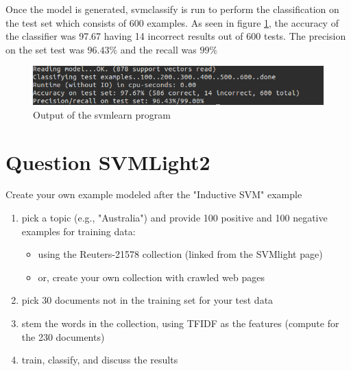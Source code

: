 \documentclass{article}
\begin{document}
Once the model is generated, svm\textunderscore classify is run to perform the classification on the test set which consists of 600 examples. As seen in figure \ref{fig:SVM_classify}, the accuracy of the classifier was 97.67 having 14 incorrect results out of 600 tests. The precision on the set test was $96.43\%$ and the recall was $99\%$ 
\begin{figure}[h]
			\centering
			\includegraphics[width=\linewidth]{svm_classify.png}
			\caption{Output of the svm\textunderscore learn program}
			\label{fig:SVM_classify}
	\end{figure}
	\section*{Question SVMLight2}
	Create your own example modeled after the "Inductive SVM" example
	\begin{enumerate}
	\item pick a topic (e.g., "Australia") and provide 100 positive and 100 negative examples for training data:
		\begin{itemize}
		\item using the Reuters-21578 collection (linked from the SVMlight page) 
		\item or, create your own collection with crawled web pages
		\end{itemize}
	\item pick 30 documents not in the training set for your test data
	\item stem the words in the collection, using TFIDF as the features (compute for the 230 documents)
	\item train, classify, and discuss the results
	\end{enumerate}  
\end{document}
